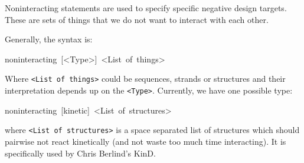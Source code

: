 \documentclass{article}
\newenvironment{code}
{\par\begin{list}{}{
\setlength{\rightmargin}{\leftmargin}
\setlength{\listparindent}{0pt}
\raggedright
\setlength{\itemsep}{0pt}
\setlength{\parsep}{0pt}
\normalfont\ttfamily}
 \item[]}
{\end{list}}
\begin{document}
Noninteracting statements are used to specify specific negative design
targets. These are sets of things that we do not want to interact
with each other.

Generally, the syntax is:
\begin{code}
noninteracting~{[}<Type>{]}~<List~of~things>
\end{code}
Where \texttt{<List of things>} could be sequences, strands or structures and
their interpretation depends up on the \texttt{<Type>}. Currently, we have
one possible type:
\begin{code}
noninteracting~{[}kinetic{]}~<List~of~structures>
\end{code}
where \texttt{<List of structures>} is a space separated list of structures
which should pairwise not react kinetically (and not waste too much
time interacting). It is specifically used by Chris Berlind's KinD.
\end{document}
